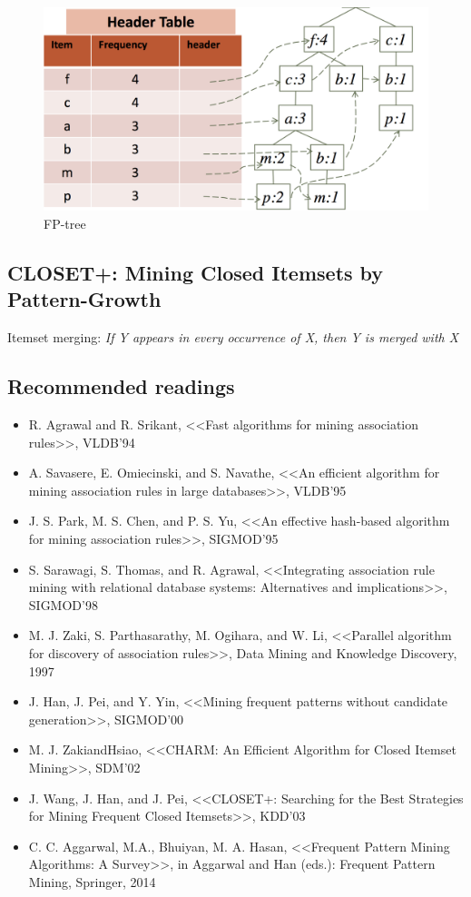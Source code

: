 \begin{figure}[h!]
    \centering
    \includegraphics[width=\linewidth]{fptree.png}
    \caption{FP-tree}
\end{figure}

\subsection{CLOSET+: Mining Closed Itemsets by Pattern-Growth}
Itemset merging: \textit{If Y appears in every occurrence of X, then Y
is merged with X}

\subsection{Recommended readings}
\begin{itemize}
\item R. Agrawal and R. Srikant, <<Fast algorithms for mining association rules>>, VLDB'94
\item A. Savasere, E. Omiecinski, and S. Navathe, <<An efficient algorithm for mining association rules in large
databases>>, VLDB'95
\item J. S. Park, M. S. Chen, and P. S. Yu, <<An effective hash-based algorithm for mining association rules>>, SIGMOD'95
\item S. Sarawagi, S. Thomas, and R. Agrawal, <<Integrating association rule mining with relational database systems: Alternatives and implications>>, SIGMOD'98
\item M. J. Zaki, S. Parthasarathy, M. Ogihara, and W. Li, <<Parallel algorithm for discovery of association rules>>, Data Mining and Knowledge Discovery, 1997
\item J. Han, J. Pei, and Y. Yin, <<Mining frequent patterns without candidate generation>>, SIGMOD’00
\item M. J. ZakiandHsiao, <<CHARM: An Efficient Algorithm for Closed Itemset Mining>>, SDM'02
\item J. Wang, J. Han, and J. Pei, <<CLOSET+: Searching for the Best Strategies for Mining Frequent Closed Itemsets>>, KDD'03
\item C. C. Aggarwal, M.A., Bhuiyan, M. A. Hasan, <<Frequent Pattern Mining Algorithms: A Survey>>, in Aggarwal and Han (eds.): Frequent Pattern Mining, Springer, 2014
\end{itemize}